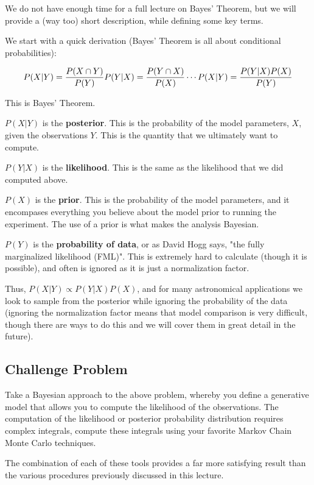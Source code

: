 \documentclass[11pt]{article}
\begin{document}
We do not have enough time for a full lecture on Bayes' Theorem, but we
will provide a (way too) short description, while defining some key
terms.

We start with a quick derivation (Bayes' Theorem is all about
conditional probabilities):

    \[ P(X|Y) = \frac{P(X \cap Y)}{P(Y)} \\
P(Y|X) = \frac{P(Y \cap X)}{P(X)} \\
\cdots \\
P(X|Y) = \frac{P(Y|X) P(X)}{P(Y)} \]

    This is Bayes' Theorem.

\(P(X|Y)\) is the \textbf{posterior}. This is the probability of the
model parameters, \(X\), given the observations \(Y\). This is the
quantity that we ultimately want to compute.

\(P(Y|X)\) is the \textbf{likelihood}. This is the same as the
likelihood that we did computed above.

\(P(X)\) is the \textbf{prior}. This is the probability of the model
parameters, and it encompases everything you believe about the model
prior to running the experiment. The use of a prior is what makes the
analysis Bayesian.

\(P(Y)\) is the \textbf{probability of data}, or as David Hogg says,
"the fully marginalized likelihood (FML)". This is extremely hard to
calculate (though it is possible), and often is ignored as it is just a
normalization factor.

    Thus, \(P(X|Y) \propto P(Y|X) P(X)\), and for many astronomical
applications we look to sample from the posterior while ignoring the
probability of the data (ignoring the normalization factor means that
model comparison is very difficult, though there are ways to do this and
we will cover them in great detail in the future).

    \subsection{Challenge Problem}\label{challenge-problem}

Take a Bayesian approach to the above problem, whereby you define a
generative model that allows you to compute the likelihood of the
observations. The computation of the likelihood or posterior probability
distribution requires complex integrals, compute these integrals using
your favorite Markov Chain Monte Carlo techniques.

The combination of each of these tools provides a far more satisfying
result than the various procedures previously discussed in this lecture.
\end{document}
